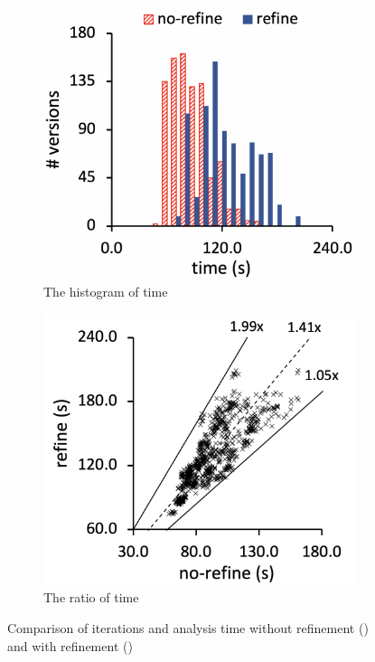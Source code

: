 \begin{figure}
\begin{subfigure}[b]{0.24\textwidth}
  \end{subfigure}
  \begin{subfigure}[b]{0.24\textwidth}
    \includegraphics[width=\textwidth]{img/compare-time}
    \caption{The histogram of time}
  \end{subfigure}
  \begin{subfigure}[b]{0.24\textwidth}
    \includegraphics[width=\textwidth]{img/ratio-time}
    \caption{The ratio of time}
  \end{subfigure}
  \caption{Comparison of iterations and analysis time without refinement
  () and with refinement ()}
  \label{fig:performance-compare}
  \vspace*{-1.5em}
\end{figure}

